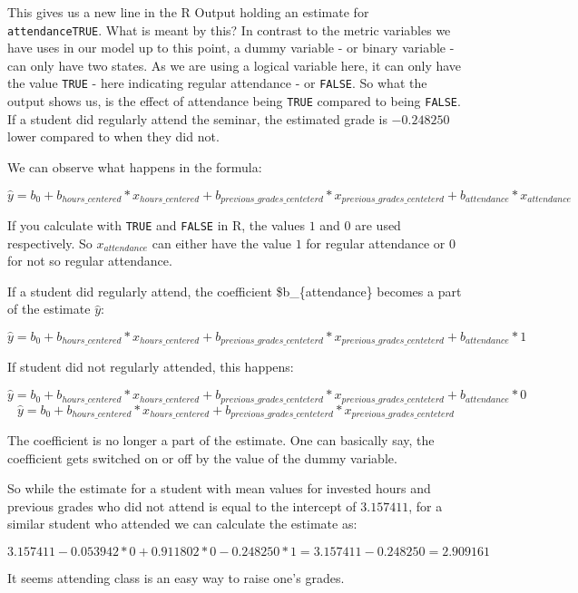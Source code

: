 \documentclass[
]{book}
\begin{document}
This gives us a new line in the R Output holding an estimate for
\texttt{attendanceTRUE}. What is meant by this? In contrast to the metric variables we
have uses in our model up to this point, a dummy variable - or binary variable -
can only have two states. As we are using a logical variable here, it can only
have the value \texttt{TRUE} - here indicating regular attendance - or \texttt{FALSE}. So what
the output shows us, is the effect of attendance being \texttt{TRUE} compared to being
\texttt{FALSE}. If a student did regularly attend the seminar, the estimated grade is
\(-0.248250\) lower compared to when they did not.

We can observe what happens in the formula:

\[\hat{y} = b_0 + b_{hours\_centered}*x_{hours\_centered} + b_{previous\_grades\_centeterd}*x_{previous\_grades\_centeterd} + b_{attendance} * x_{attendance}\]

If you calculate with \texttt{TRUE} and \texttt{FALSE} in R, the values \(1\) and \(0\) are used
respectively. So \(x_{attendance}\) can either have the value \(1\) for regular
attendance or \(0\) for not so regular attendance.

If a student did regularly attend, the coefficient \$b\_\{attendance\} becomes a
part of the estimate \(\hat{y}\):

\[\hat{y} = b_0 + b_{hours\_centered}*x_{hours\_centered} + b_{previous\_grades\_centeterd}*x_{previous\_grades\_centeterd} + b_{attendance} * 1\]

If student did not regularly attended, this happens:

\[\hat{y} = b_0 + b_{hours\_centered}*x_{hours\_centered} + b_{previous\_grades\_centeterd}*x_{previous\_grades\_centeterd} + b_{attendance} * 0\]
\[\hat{y} = b_0 + b_{hours\_centered}*x_{hours\_centered} + b_{previous\_grades\_centeterd}*x_{previous\_grades\_centeterd}\]

The coefficient is no longer a part of the estimate. One can basically say, the
coefficient gets switched on or off by the value of the dummy variable.

So while the estimate for a student with mean values for invested hours and
previous grades who did not attend is equal to the intercept of \(3.157411\),
for a similar student who attended we can calculate the estimate as:

\[3.157411 - 0.053942*0 + 0.911802*0 - 0.248250 * 1 = 3.157411 - 0.248250 = 2.909161\]

It seems attending class is an easy way to raise one's grades.
\end{document}
